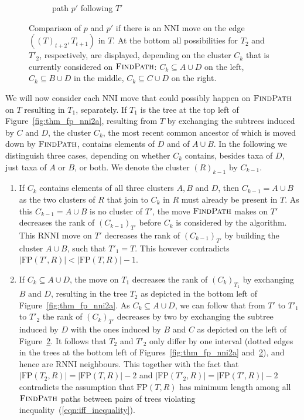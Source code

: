 \documentclass{amsart}
\newcommand{\rnni}{\mathrm{RNNI}}
\newcommand{\findpath}{\textsc{FindPath}}
\newcommand{\nni}{\mathrm{NNI}}
\newcommand{\fp}{\mathrm{FP}}
\begin{document}
\begin{enumerate}[label = 1.{\arabic*}]
\begin{figure}[H]
\begin{subfigure}[b]{.45\textwidth}
		\vspace{12pt}
		\caption{path $p'$ following $T'$}
		\label{fig:thm_fp_nni2b}
	\end{subfigure}
	\caption{Comparison of $p$ and $p'$ if there is an $\nni$ move on the edge $((T)_{t+2},T_{t+1})$ in $T$.
	At the bottom all possibilities for $T_2$ and $T'_2$, respectively, are displayed, depending on the cluster $C_k$ that is currently considered on $\findpath$:
	${C_k \subseteq A \cup D}$ on the left, ${C_k \subseteq B \cup D}$ in the middle, ${C_k \subseteq C \cup D}$ on the right.}
\end{figure}

We will now consider each $\nni$ move that could possibly happen on $\findpath$ on $T$ resulting in $T_1$, separately.
If $T_1$ is the tree at the top left of Figure~\ref{fig:thm_fp_nni2a}, resulting from $T$ by exchanging the subtrees induced by $C$ and $D$, the cluster $C_k$, the most recent common ancestor of which is moved down by $\findpath$, contains elements of $D$ and of $A \cup B$.
In the following we distinguish three cases, depending on whether $C_k$ contains, besides taxa of $D$, just taxa of $A$ or $B$, or both.
We denote the cluster $(R)_{k-1}$ by $C_{k-1}$.

\begin{enumerate}[label = \theenumi.\arabic*]
    \item If $C_k$ contains elements of all three clusters $A, B$ and $D$, then $C_{k-1} = A \cup B$ as the two clusters of $R$ that join to $C_k$ in $R$ must already be present in $T$.
    As this $C_{k-1} = A \cup B$ is no cluster of $T'$, the move $\findpath$ makes on $T'$ decreases the rank of $(C_{k-1})_{T'}$ before $C_k$ is considered by the algorithm.
    This $\rnni$ move on $T'$ decreases the rank of $(C_{k-1})_{T'}$ by building the cluster $A \cup B$, such that $T'_1 = T$.
	This however contradicts $|\fp(T',R)| < |\fp(T,R)| - 1$.

    \item If $C_k \subseteq A \cup D$, the move on $T_1$ decreases the rank of $(C_k)_{T_1}$ by exchanging $B$ and $D$, resulting in the tree  $T_2$ as depicted in the bottom left of Figure~\ref{fig:thm_fp_nni2a}.
	As $C_k \subseteq A \cup D$, we can follow that from $T'$ to $T'_1$ to $T'_2$ the rank of $(C_k)_{T'}$ decreases by two by exchanging the subtree induced by $D$ with the ones induced by $B$ and $C$ as depicted on the left of Figure~\ref{fig:thm_fp_nni2b}.
	It follows that $T_2$ and $T'_2$ only differ by one interval (dotted edges in the trees at the bottom left of Figures~\ref{fig:thm_fp_nni2a} and~\ref{fig:thm_fp_nni2b}), and hence are $\rnni$ neighbours.
	This together with the fact that $|\fp(T_2,R)| = |\fp(T,R)|-2$ and  $|\fp(T'_2,R)| = |\fp(T',R)|-2$ contradicts the assumption that $\fp(T,R)$ has minimum length among all $\findpath$ paths between pairs of trees violating inequality~(\ref{eqn:iff_inequality}).


\end{enumerate}
\end{enumerate}
\end{document}
